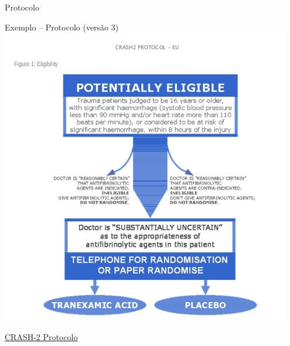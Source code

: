 \documentclass{beamer}
\begin{document}
\begin{frame}{Protocolo}
  \begin{exampleblock}{Exemplo -- Protocolo (versão 3)}
    \centering
    \includegraphics[height=.8\textheight]{Planejamento/CRASH-proto3}

  \end{exampleblock}
  \vfill
  \scriptsize
  \hfill \href{http://www.crash2.lshtm.ac.uk/Protocol_Eng.html}{CRASH-2 Protocolo}
\end{frame}
\end{document}
